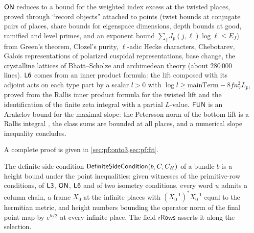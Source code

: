 \begin{proofoutline}
$\mathsf{ON}$ reduces to a bound for the weighted index excess at the twisted places, proved through ``record
objects'' attached to points (twist bounds at conjugate pairs of places, share bounds for eigenspace dimensions,
depth bounds at good, ramified and level primes, and an exponent bound $\sum_\ell J_p(j,\ell)\log\ell\le E_J$) from
Green's theorem, Clozel's purity, $\ell$-adic Hecke characters, Chebotarev, Galois representations of polarized
cuspidal representations, base change, the crystalline lattices of Bhatt--Scholze and archimedean theory (about
$280\,000$ lines). $\mathsf{L6}$ comes from an inner product formula: the lift composed with its adjoint acts on
each type part by a scalar $l>0$ with $\log l\ge\mathrm{mainTerm}-8fn_V^2L_p$, proved from the Rallis inner product
formula for the twisted lift and the identification of the finite zeta integral with a partial $L$-value.
$\mathsf{FUN}$ is an Arakelov bound for the maximal slope: the Petersson norm of the bottom lift is a Rallis
integral \cite{Rallis1984,KudlaRallis1994}, the class sums are bounded at all places, and a numerical slope
inequality concludes.

A complete proof is given in \cref{sec:pf:onto3,sec:pf:fit}.
\end{proofoutline}

The definite-side condition $\mathsf{DefiniteSideCondition}(b,C,C_H)$ of a bundle $b$ is a height bound under the
point inequalities: given witnesses of the primitive-row conditions, of $\mathsf{L3}$, $\mathsf{ON}$, $\mathsf{L6}$
and of two isometry conditions, every word $u$ admits a column chain, a frame $X_0$ at the infinite places with
$(X_0^{-1})^*X_0^{-1}$ equal to the hermitian metric, and height numbers bounding the operator norm of the final
point map by $e^{h/2}$ at every infinite place. The field $\mathsf{rRows}$ asserts it along the selection.

